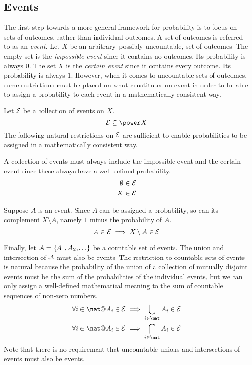 \documentclass{article}
\begin{document}
\subsection{Events}

The first step towards a more general framework for probability is to focus on sets of outcomes, rather than individual outcomes.
A set of outcomes is referred to as an {\it event}. 
Let $X$ be an arbitrary, possibly uncountable, set of outcomes.
The empty set is the {\it impossible event} since it contains no outcomes. Its probability is always $0$.
The set $X$ is the {\it certain event} since it contains every outcome. Its probability is always $1$.
However, when it comes to uncountable sets of outcomes, some restrictions must be placed on what constitutes on event in order to be able to
assign a probability to each event in a mathematically consistent way.

\newcommand{\calE}{{\cal E}}

Let $\cal E$ be a collection of events on $X$.
\begin{equation}
	{\cal E} \subseteq \power X
\end{equation}
The following natural restrictions on $\cal E$ are sufficient to enable probabilities to be assigned in a mathematically consistent way.

A collection of events must always include the impossible event and the certain event since these always have a well-defined probability.
\begin{eqnarray}
	\emptyset \in {\cal E} \\
	X \in {\cal E}
\end{eqnarray}

Suppose $A$ is an event.
Since $A$ can be assigned a probability, so can its complement $ X \setminus A$, namely $1$ minus the probability of $A$.
\begin{equation}
	A \in {\cal E} \implies X \setminus A \in {\cal E}
\end{equation}

Finally, let ${\cal A} = \{A_1, A_2, \ldots\}$ be a countable set of events. 
The union and intersection of $\cal A$ must also be events.
The restriction to countable sets of events is natural because the probability of the union of a collection of mutually disjoint events must be the
sum of the probabilities of the individual events, but we can only assign a well-defined mathematical meaning to the sum of countable sequences of non-zero numbers.
\begin{eqnarray}
	\forall i \in \nat @ A_i \in {\cal E} \implies \bigcup_{i \in \nat} A_i \in {\cal E} \\
	\forall i \in \nat @ A_i \in {\cal E} \implies \bigcap_{i \in \nat} A_i \in {\cal E} 
\end{eqnarray}
Note that there is no requirement that uncountable unions and intersections of events must also be events.
\end{document}
